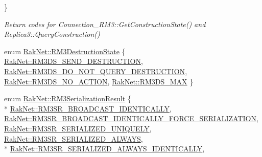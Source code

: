 \begin{DoxyCompactItemize}
 \}
\begin{DoxyCompactList}\small\item\em Return codes for Connection\-\_\-\-R\-M3\-::\-Get\-Construction\-State() and Replica3\-::\-Query\-Construction() \end{DoxyCompactList}\item 
enum \hyperlink{group___r_e_p_l_i_c_a___m_a_n_a_g_e_r___g_r_o_u_p3_ga400c157a937f062bd8a3c19a49d33541}{Rak\-Net\-::\-R\-M3\-Destruction\-State} \{ \hyperlink{group___r_e_p_l_i_c_a___m_a_n_a_g_e_r___g_r_o_u_p3_gga400c157a937f062bd8a3c19a49d33541a8659a52c28938633a464e505249dcdcf}{Rak\-Net\-::\-R\-M3\-D\-S\-\_\-\-S\-E\-N\-D\-\_\-\-D\-E\-S\-T\-R\-U\-C\-T\-I\-O\-N}, 
\hyperlink{group___r_e_p_l_i_c_a___m_a_n_a_g_e_r___g_r_o_u_p3_gga400c157a937f062bd8a3c19a49d33541a12b9942935d79a55fc3943466e4b1204}{Rak\-Net\-::\-R\-M3\-D\-S\-\_\-\-D\-O\-\_\-\-N\-O\-T\-\_\-\-Q\-U\-E\-R\-Y\-\_\-\-D\-E\-S\-T\-R\-U\-C\-T\-I\-O\-N}, 
\hyperlink{group___r_e_p_l_i_c_a___m_a_n_a_g_e_r___g_r_o_u_p3_gga400c157a937f062bd8a3c19a49d33541a84680d8d2b68f5360a11fb2dd50a335f}{Rak\-Net\-::\-R\-M3\-D\-S\-\_\-\-N\-O\-\_\-\-A\-C\-T\-I\-O\-N}, 
\hyperlink{group___r_e_p_l_i_c_a___m_a_n_a_g_e_r___g_r_o_u_p3_gga400c157a937f062bd8a3c19a49d33541a7651f853d06fc836b035bbf91aa6a266}{Rak\-Net\-::\-R\-M3\-D\-S\-\_\-\-M\-A\-X}
 \}
\item 
enum \hyperlink{group___r_e_p_l_i_c_a___m_a_n_a_g_e_r___g_r_o_u_p3_ga993da25eb23b67455e2438971c51429c}{Rak\-Net\-::\-R\-M3\-Serialization\-Result} \{ \\*
\hyperlink{group___r_e_p_l_i_c_a___m_a_n_a_g_e_r___g_r_o_u_p3_gga993da25eb23b67455e2438971c51429ca574f9c4ac43601e7e49ff56a796a3fe2}{Rak\-Net\-::\-R\-M3\-S\-R\-\_\-\-B\-R\-O\-A\-D\-C\-A\-S\-T\-\_\-\-I\-D\-E\-N\-T\-I\-C\-A\-L\-L\-Y}, 
\hyperlink{group___r_e_p_l_i_c_a___m_a_n_a_g_e_r___g_r_o_u_p3_gga993da25eb23b67455e2438971c51429ca03ccf6a7cb2e7bc303525529c3cf2fa3}{Rak\-Net\-::\-R\-M3\-S\-R\-\_\-\-B\-R\-O\-A\-D\-C\-A\-S\-T\-\_\-\-I\-D\-E\-N\-T\-I\-C\-A\-L\-L\-Y\-\_\-\-F\-O\-R\-C\-E\-\_\-\-S\-E\-R\-I\-A\-L\-I\-Z\-A\-T\-I\-O\-N}, 
\hyperlink{group___r_e_p_l_i_c_a___m_a_n_a_g_e_r___g_r_o_u_p3_gga993da25eb23b67455e2438971c51429ca433b42251411758236dff004c87d0814}{Rak\-Net\-::\-R\-M3\-S\-R\-\_\-\-S\-E\-R\-I\-A\-L\-I\-Z\-E\-D\-\_\-\-U\-N\-I\-Q\-U\-E\-L\-Y}, 
\hyperlink{group___r_e_p_l_i_c_a___m_a_n_a_g_e_r___g_r_o_u_p3_gga993da25eb23b67455e2438971c51429ca80ff6894a8a24e8ec6bd6895501628b5}{Rak\-Net\-::\-R\-M3\-S\-R\-\_\-\-S\-E\-R\-I\-A\-L\-I\-Z\-E\-D\-\_\-\-A\-L\-W\-A\-Y\-S}, 
\\*
\hyperlink{group___r_e_p_l_i_c_a___m_a_n_a_g_e_r___g_r_o_u_p3_gga993da25eb23b67455e2438971c51429ca065bb061cfc67fc94c4ddc147cd9e525}{Rak\-Net\-::\-R\-M3\-S\-R\-\_\-\-S\-E\-R\-I\-A\-L\-I\-Z\-E\-D\-\_\-\-A\-L\-W\-A\-Y\-S\-\_\-\-I\-D\-E\-N\-T\-I\-C\-A\-L\-L\-Y}, 

\end{DoxyCompactItemize}
